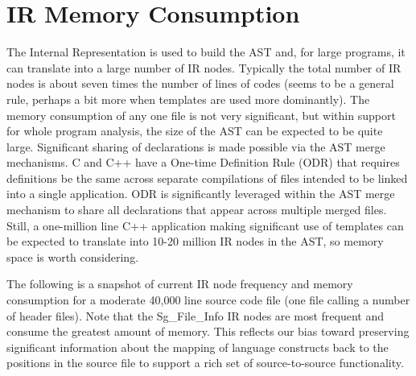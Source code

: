 \section{IR Memory Consumption}
    The Internal Representation is used to build the AST and, for large programs,
it can translate into a large number of IR nodes.  Typically the total number of 
IR nodes is about seven times the number of lines of codes (seems to be a general 
rule, perhaps a bit more when templates are used more dominantly).  The memory
consumption of any one file is not very significant, but within support for whole
program analysis, the size of the AST can be expected to be quite large.  Significant
sharing of declarations is made possible via the AST merge mechanisms.  C and C++
have a One-time Definition Rule (ODR) that requires definitions be the same
across separate compilations of files intended to be linked into a single application.
ODR is significantly leveraged within the AST merge mechanism to share all declarations
that appear across multiple merged files.  Still, a one-million line C++ application 
making significant use of templates can be expected to translate into 10-20 million 
IR nodes in the AST, so memory space is worth considering.

   The following is a snapshot of current IR node frequency and memory consumption for
a moderate 40,000 line source code file (one file calling a number of header files).
Note that the Sg\_File\_Info IR nodes are most frequent and consume the greatest amount 
of memory. This reflects our bias toward preserving significant information about the
mapping of language constructs back to the positions in the source file to support
a rich set of source-to-source functionality.

